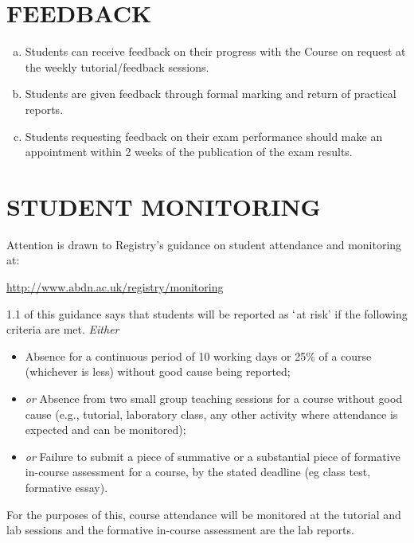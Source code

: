 \documentclass[12pts,a4paper,amsmath,amssymb,floatfix]{article}%
\begin{document}
\section{FEEDBACK}
\begin{enumerate}[(a)]
\item Students can receive feedback on their progress with the Course on request at the weekly tutorial/feedback sessions.
\item Students are given feedback through formal marking and return of practical reports.
\item Students requesting feedback on their exam performance should make an appointment within 2 weeks of the publication of the exam results.
\end{enumerate}


\section{STUDENT MONITORING}
Attention is drawn to Registry's guidance on student attendance and monitoring at:
\begin{center}
\href{http://www.abdn.ac.uk/registry/monitoring}{http://www.abdn.ac.uk/registry/monitoring}
\end{center}
1.1 of this guidance says that students will be reported as $\lq$at risk' if the following criteria are met. {\it Either}
\begin{itemize}
\item Absence for a continuous period of 10 working days or 25$\%$ of a course (whichever is less) without good cause being reported;
\item {\it or} Absence from two small group teaching sessions for a course without good cause (e.g., tutorial, laboratory class, any other activity where attendance is  expected and can be monitored);
\item {\it or} Failure to submit a piece of summative or a substantial piece of formative in-course assessment for a course, by the stated deadline (eg class test, formative essay).
\end{itemize}
For the purposes of this, course attendance will be monitored at the tutorial and lab sessions and the formative in-course assessment are the lab reports.
\end{document}
